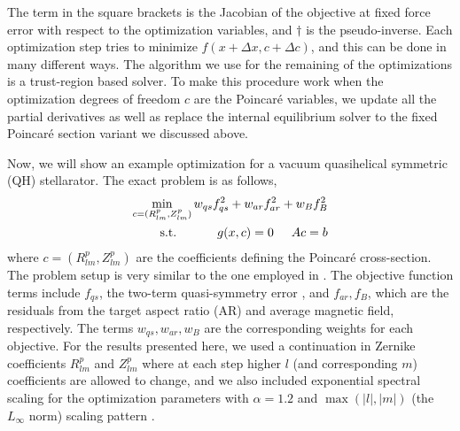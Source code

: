 \documentclass{jpp}
\newcommand{\dx}{\Delta x}
\newcommand{\dc}{\Delta c}
\begin{document}
The term in the square brackets is the Jacobian of the objective at fixed force error with respect to the optimization variables, and $\dagger$ is the pseudo-inverse. Each optimization step tries to minimize $f(x + \dx,c + \dc)$, and this can be done in many different ways. The algorithm we use for the remaining of the optimizations is a trust-region based solver. To make this procedure work when the optimization degrees of freedom $c$ are the Poincaré variables, we update all the partial derivatives as well as replace the internal equilibrium solver to the fixed Poincaré section variant we discussed above.

Now, we will show an example optimization for a vacuum quasihelical symmetric (QH) stellarator. The exact problem is as follows,
\begin{equation}
    \begin{split}
        \min_{c=(R^p_{lm}, Z^p_{lm})} w_{qs}f_{qs}^2 + w_{ar}f_{ar}^2 + w_{B}f_{B}^2 \\
        \text{s.t. } \hspace{1cm} g(x, c)=0 \hspace{0.5cm}  Ac=b
    \end{split}
\end{equation}
where $c=(R^p_{lm}, Z^p_{lm})$ are the coefficients defining the Poincaré cross-section. The problem setup is very similar to the one employed in \cite{landremanMagneticFieldsPrecise2022}. The objective function terms include $f_{qs}$, the two-term quasi-symmetry error \citep{helanderIntrinsicAmbipolarityRotation2008a, rodriguezMeasuresQuasisymmetryStellarators2022a}, and $f_{ar}, f_{B}$, which are the residuals from the target aspect ratio (AR) and average magnetic field, respectively. The terms $w_{qs}, w_{ar}, w_{B}$ are the corresponding weights for each objective. For the results presented here, we used a continuation in Zernike coefficients $R^p_{lm}$ and $Z^p_{lm}$ where at each step higher $l$ (and corresponding $m$) coefficients are allowed to change, and we also included exponential spectral scaling for the optimization parameters with $\alpha=1.2$ and $\max(|l|, |m|)$ (the $L_\infty$ norm) scaling pattern \citep{jangExponentialSpectralScaling2026}.
\end{document}
